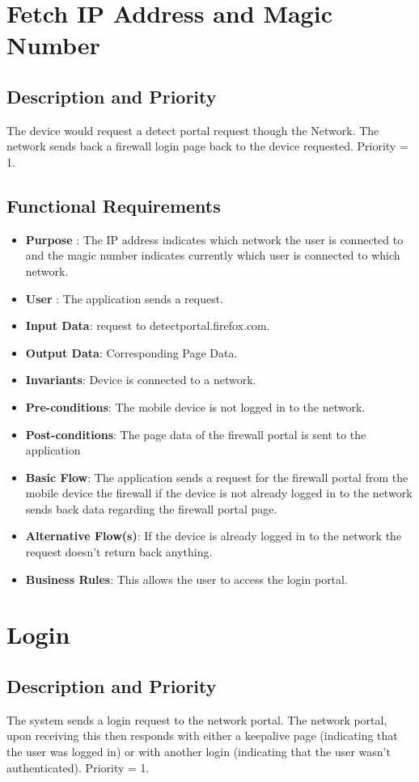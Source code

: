 \section{Fetch IP Address and Magic Number}
\subsection{Description and Priority}
The device would request a detect portal request though the Network. The network sends back a firewall login page back to the device requested.
Priority = 1.

\subsection{Functional Requirements}
\begin{itemize}
    \item \textbf{Purpose} : The IP address indicates which network the user is connected to and the magic number indicates currently which user is connected to which network.
    \item \textbf{User} : The application sends a request.
    \item \textbf{Input Data}: request to detectportal.firefox.com.
    \item \textbf{Output Data}: Corresponding Page Data.
    \item \textbf{Invariants}: Device is connected to a network.
    \item \textbf{Pre-conditions}: The mobile device is not logged in to the network.
    \item \textbf{Post-conditions}: The page data of the firewall portal is sent to the application
    \item \textbf{Basic Flow}: The application sends a request for the firewall portal from the mobile device the firewall if the device is not already logged in to the network sends back data regarding the firewall portal page.
    \item \textbf{Alternative Flow(s)}: If the device is already logged in to the network the request doesn't return back anything.
    \item \textbf{Business Rules}: This allows the user to access the login portal.
\end{itemize}

\section{Login}
\subsection{Description and Priority}
The system sends a login request to the network portal. The network portal, upon receiving this then responds with either a keepalive page (indicating that the user was logged in) or with another login (indicating that the user wasn't authenticated).
Priority = 1. \\

